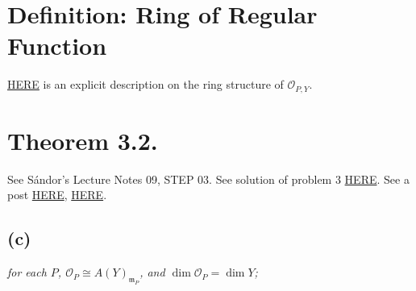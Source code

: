 \section{Definition: Ring of Regular Function}
\href{https://www2.math.ethz.ch/education/bachelor/lectures/fs2016/math/alg_geom/Solution8.pdf}{HERE} is an explicit description on the ring structure of $\mathcal O_{P,Y}$.

\section{Theorem 3.2.}

See S\'andor's Lecture Notes 09, STEP 03.
See solution of problem 3 \href{https://www2.math.ethz.ch/education/bachelor/lectures/fs2016/math/alg_geom/Solution8.pdf}{HERE}.
See a post \href{https://math.stackexchange.com/questions/1337842/with-regards-to-theorem-3-2-in-hartshorne-are-regular-functions-on-a-variety-si}{HERE}, \href{https://math.stackexchange.com/questions/1909153/some-questions-on-hartshornes-theorem-i-3-2}{HERE}.

\subsection{(c)}
\textit{for each $P$, $\mathcal O_P\cong A(Y)_{\mathfrak m _P}$, and $\operatorname{dim}\mathcal O_P=\operatorname{dim} Y$; }

